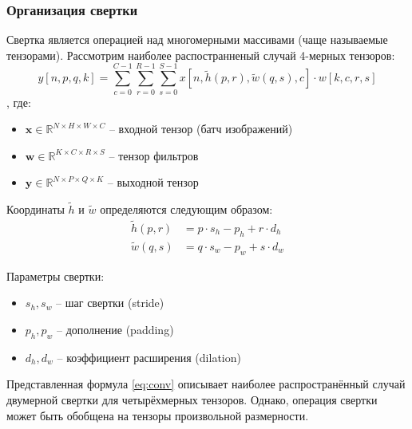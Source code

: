 \subsubsection{Организация свертки}
Свертка является операцией над многомерными массивами (чаще называемые тензорами). Рассмотрим наиболее распостранненый случай 4-мерных тензоров:
\begin{equation}
\label{eq:conv}
y[n,p,q,k] = \sum_{c=0}^{C-1} \sum_{r=0}^{R-1} \sum_{s=0}^{S-1} x[n, \tilde{h}(p,r), \tilde{w}(q,s), c] \cdot w[k,c,r,s]
\end{equation},
где:
\begin{itemize}
    \item $\mathbf{x} \in \mathbb{R}^{N \times H \times W \times C}$ -- входной тензор (батч изображений)
    \item $\mathbf{w} \in \mathbb{R}^{K \times C \times R \times S}$ -- тензор фильтров
    \item $\mathbf{y} \in \mathbb{R}^{N \times P \times Q \times K}$ -- выходной тензор
\end{itemize}

Координаты $\tilde{h}$ и $\tilde{w}$ определяются следующим образом:
\begin{align}
\tilde{h}(p,r) &= p \cdot s_h - p_h + r \cdot d_h \label{eq:coord_transform_h} \\
\tilde{w}(q,s) &= q \cdot s_w - p_w + s \cdot d_w \label{eq:coord_transform_w}
\end{align}

Параметры свертки:
\begin{itemize}
    \item $s_h, s_w$ -- шаг свертки (stride)
    \item $p_h, p_w$ -- дополнение (padding)
    \item $d_h, d_w$ -- коэффициент расширения (dilation)
\end{itemize}

Представленная формула \eqref{eq:conv} описывает наиболее распространённый случай двумерной свертки для четырёхмерных тензоров.
Однако, операция свертки может быть обобщена на тензоры произвольной размерности.

